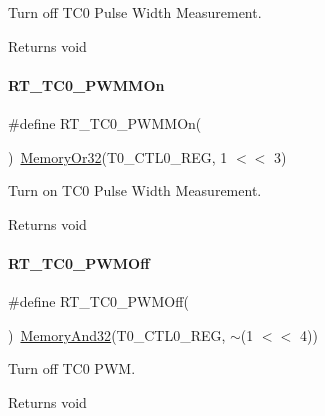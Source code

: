 Turn off T\+C0 Pulse Width Measurement. 

\begin{DoxyReturn}{Returns}
void 
\end{DoxyReturn}
\mbox{\label{a00041_aac1f2943fc99c1197cda6bc5c0fce669}} 
\paragraph{\texorpdfstring{R\+T\+\_\+\+T\+C0\+\_\+\+P\+W\+M\+M\+On}{RT\_TC0\_PWMMOn}}
{\footnotesize\ttfamily \#define R\+T\+\_\+\+T\+C0\+\_\+\+P\+W\+M\+M\+On(\begin{DoxyParamCaption}{ }\end{DoxyParamCaption})~\mbox{\hyperlink{a00020_a9ea92ebccdef6bdaca4d00210cc7266d}{Memory\+Or32}}(T0\+\_\+\+C\+T\+L0\+\_\+\+R\+EG, 1 $<$$<$ 3)}



Turn on T\+C0 Pulse Width Measurement. 

\begin{DoxyReturn}{Returns}
void 
\end{DoxyReturn}
\mbox{\label{a00041_a043d535ff9aad665ddf1521169a0f187}} 
\paragraph{\texorpdfstring{R\+T\+\_\+\+T\+C0\+\_\+\+P\+W\+M\+Off}{RT\_TC0\_PWMOff}}
{\footnotesize\ttfamily \#define R\+T\+\_\+\+T\+C0\+\_\+\+P\+W\+M\+Off(\begin{DoxyParamCaption}{ }\end{DoxyParamCaption})~\mbox{\hyperlink{a00020_a5c1a2bd4c1bd4c2f429d8042a45327ff}{Memory\+And32}}(T0\+\_\+\+C\+T\+L0\+\_\+\+R\+EG, $\sim$(1 $<$$<$ 4))}



Turn off T\+C0 P\+WM. 

\begin{DoxyReturn}{Returns}
void 
\end{DoxyReturn}
\mbox{\label{a00041_a70e69675d0a4e7d5095f938dffa14779}} 
